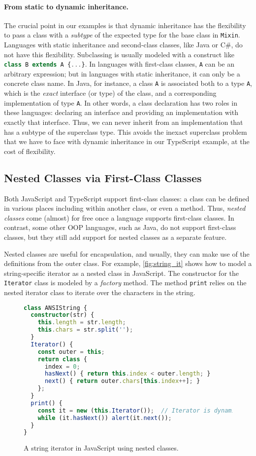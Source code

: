 \paragraph{From static to dynamic inheritance.}
The crucial point in our examples is that dynamic inheritance has the
flexibility to pass a class with a \emph{subtype} of the expected type for the
base class in \lstinline{Mixin}. Languages with static inheritance and
second-class classes, like Java or C\#, do not have this flexibility.
Subclassing is usually modeled with a construct like
\lstinline[language=TypeScript]|class B extends A {...}|. In languages with
first-class classes, \lstinline{A} can be an arbitrary expression; but in
languages with static inheritance, it can only be a concrete class name. In
Java, for instance, a class \lstinline{A} is associated both to a type
\lstinline{A}, which is the \emph{exact} interface (or type) of the class, and a
corresponding implementation of type \lstinline{A}. In other words, a class
declaration has two roles in these languages: declaring an interface and
providing an implementation with exactly that interface. Thus, we can never
inherit from an implementation that has a subtype of the superclass type. This
avoids the inexact superclass problem that we have to face with dynamic
inheritance in our TypeScript example, at the cost of flexibility.

\subsection{Nested Classes via First-Class Classes}

Both JavaScript and TypeScript support first-class classes: a class can be
defined in various places including within another class, or even a method.
Thus, \emph{nested classes} come (almost) for free once a language supports
first-class classes. In contrast, some other OOP languages, such as Java, do not
support first-class classes, but they still add support for nested classes as a
separate feature.

Nested classes are useful for encapsulation, and usually, they can make use of
the definitions from the outer class. For example, \autoref{fig:string_it} shows
how to model a string-specific iterator as a nested class in JavaScript. The
constructor for the \lstinline{Iterator} class is modeled by a \emph{factory}
method. The method \lstinline{print} relies on the nested iterator class to
iterate over the characters in the string.

\begin{figure}
\begin{lstlisting}[language=TypeScript]
class ANSIString {
  constructor(str) {
    this.length = str.length;
    this.chars = str.split('');
  }
  Iterator() {
    const outer = this;
    return class {
      index = 0;
      hasNext() { return this.index < outer.length; }
      next() { return outer.chars[this.index++]; }
    };
  }
  print() {
    const it = new (this.Iterator());  // Iterator is dynamically bound.
    while (it.hasNext()) alert(it.next());
  }
}
\end{lstlisting}
\caption{A string iterator in JavaScript using nested classes.}
\label{fig:string_it}
\end{figure}

